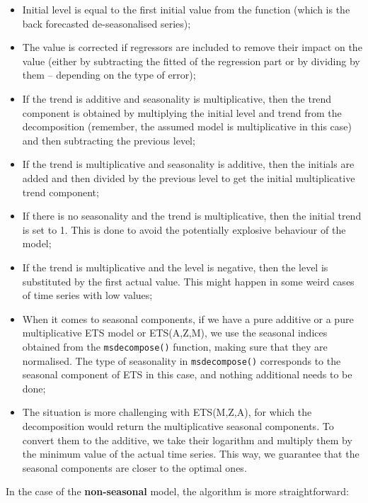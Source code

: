 \documentclass[]{book}
\providecommand{\tightlist}{%
  \setlength{\itemsep}{0pt}\setlength{\parskip}{0pt}}
\theoremstyle{definition}
\theoremstyle{definition}
\theoremstyle{definition}
\theoremstyle{definition}
\theoremstyle{remark}
\begin{document}
\begin{itemize}
\tightlist
\item
  Initial level is equal to the first initial value from the function (which is the back forecasted de-seasonalised series);
\item
  The value is corrected if regressors are included to remove their impact on the value (either by subtracting the fitted of the regression part or by dividing by them -- depending on the type of error);
\item
  If the trend is additive and seasonality is multiplicative, then the trend component is obtained by multiplying the initial level and trend from the decomposition (remember, the assumed model is multiplicative in this case) and then subtracting the previous level;
\item
  If the trend is multiplicative and seasonality is additive, then the initials are added and then divided by the previous level to get the initial multiplicative trend component;
\item
  If there is no seasonality and the trend is multiplicative, then the initial trend is set to 1. This is done to avoid the potentially explosive behaviour of the model;
\item
  If the trend is multiplicative and the level is negative, then the level is substituted by the first actual value. This might happen in some weird cases of time series with low values;
\item
  When it comes to seasonal components, if we have a pure additive or a pure multiplicative ETS model or ETS(A,Z,M), we use the seasonal indices obtained from the \texttt{msdecompose()} function, making sure that they are normalised. The type of seasonality in \texttt{msdecompose()} corresponds to the seasonal component of ETS in this case, and nothing additional needs to be done;
\item
  The situation is more challenging with ETS(M,Z,A), for which the decomposition would return the multiplicative seasonal components. To convert them to the additive, we take their logarithm and multiply them by the minimum value of the actual time series. This way, we guarantee that the seasonal components are closer to the optimal ones.
\end{itemize}

In the case of the \textbf{non-seasonal} model, the algorithm is more straightforward:
\end{document}
